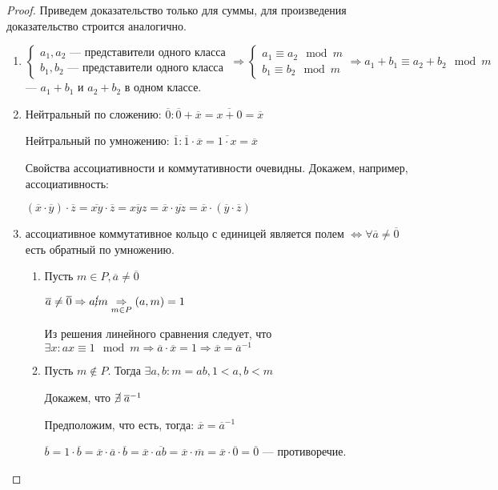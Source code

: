\begin{proof}
  Приведем доказательство только для суммы, для произведения доказательство строится аналогично.
  \begin{enumerate}   
    \item $\begin{cases}
        a_1, a_2 \text{ --- представители одного класса} \\
        b_1, b_2 \text{ --- представители одного класса}
      \end{cases} \Rightarrow \begin{cases}
        a_1 \equiv a_2 \mod m \\
        b_1 \equiv b_2 \mod m
      \end{cases} \Rightarrow a_1 + b_1 \equiv a_2 + b_2 \mod m$ --- $a_1 + b_1$ и $a_2 + b_2$ в одном классе.
    \item Нейтральный по сложению: $\overline{0}: \overline{0} + \overline{x} = \overline{x + 0} = \overline{x}$
      
    Нейтральный по умножению: $\overline{1}: \overline{1} \cdot \overline{x} = \overline{1 \cdot x} = \overline{x}$

    Свойства ассоциативности и коммутативности очевидны. Докажем, например, ассоциативность:

      $(\overline{x} \cdot \overline{y})\cdot \overline{z} = \overline{xy} \cdot \overline{z} = \overline{xyz} = \overline{x} \cdot \overline{yz} = \overline{x} \cdot (\overline{y} \cdot \overline{z})$
      \item ассоциативное коммутативное кольцо с единицей является полем $\Leftrightarrow \forall \overline{a} \neq \overline{0}$ есть обратный по умножению.
      
      \begin{enumerate}
        \item Пусть $m \in P, \overline{a} \neq \overline{0}$
        
        $\overline{a} \neq \overline{0} \Rightarrow a \cancel{\divby} m \underset{m \in P}{\Rightarrow} (a, m) = 1$

        Из решения линейного сравнения следует, что $\exists x: ax \equiv 1 \mod m \Rightarrow \overline{a} \cdot \overline{x} = 1 \Rightarrow \overline{x} = \overline{a}^{-1}$
        \item Пусть $m \notin P$. Тогда $\exists a, b: m = ab, 1 < a, b < m$
        
        Докажем, что $\cancel{\exists} \; \overline{a}^{-1}$

        Предположим, что есть, тогда: $\overline{x} = \overline{a}^{-1}$

        $\overline{b} = 1 \cdot \overline{b} = \overline{x} \cdot \overline{a} \cdot \overline{b} = \overline{x} \cdot \overline{ab} = \overline{x} \cdot \overline{m} = \overline{x} \cdot \overline{0} = \overline{0}$ --- противоречие.
      \end{enumerate}
  \end{enumerate}
\end{proof}

